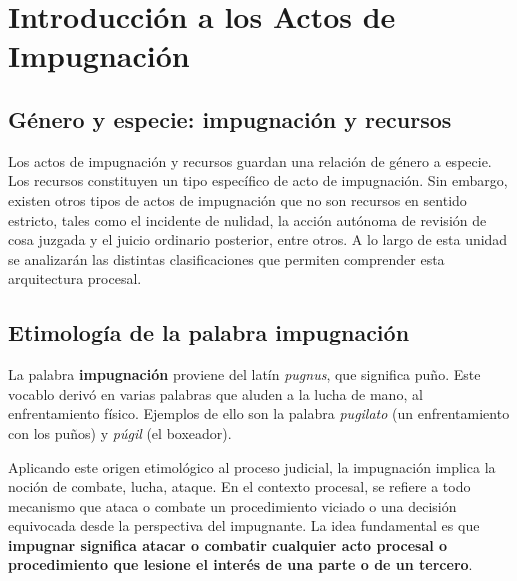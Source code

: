 \documentclass[12pt,oneside]{book}
\begin{document}

\clearpage
\tableofcontents


\chapter{Introducción a los Actos de Impugnación}

\section{Género y especie: impugnación y recursos}

Los actos de impugnación y recursos guardan una relación de género a especie. Los recursos constituyen un tipo específico de acto de impugnación. Sin embargo, existen otros tipos de actos de impugnación que no son recursos en sentido estricto, tales como el incidente de nulidad, la acción autónoma de revisión de cosa juzgada y el juicio ordinario posterior, entre otros. A lo largo de esta unidad se analizarán las distintas clasificaciones que permiten comprender esta arquitectura procesal.

\section{Etimología de la palabra impugnación}

La palabra \textbf{impugnación} proviene del latín \textit{pugnus}, que significa puño. Este vocablo derivó en varias palabras que aluden a la lucha de mano, al enfrentamiento físico. Ejemplos de ello son la palabra \textit{pugilato} (un enfrentamiento con los puños) y \textit{púgil} (el boxeador).

Aplicando este origen etimológico al proceso judicial, la impugnación implica la noción de combate, lucha, ataque. En el contexto procesal, se refiere a todo mecanismo que ataca o combate un procedimiento viciado o una decisión equivocada desde la perspectiva del impugnante. La idea fundamental es que \textbf{impugnar significa atacar o combatir cualquier acto procesal o procedimiento que lesione el interés de una parte o de un tercero}.
\end{document}
